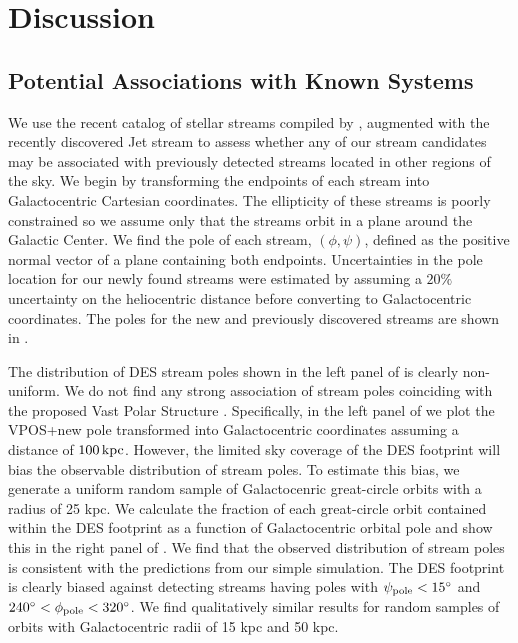\documentclass[twocolumn]{aastex61}
\begin{document}
\section{Discussion}
\label{sec:discussion}

\subsection{Potential Associations with Known Systems}
\label{sec:assocs}
We use the recent catalog of stellar streams compiled by \citet{Mateu:2017}, augmented with the recently discovered Jet stream \citep{Jethwa:2017} to assess whether any of our stream candidates may be associated with previously detected streams located in other regions of the sky. 
We begin by transforming the endpoints of each stream into Galactocentric Cartesian coordinates. 
The ellipticity of these streams is poorly constrained so we assume only that the streams orbit in a plane around the Galactic Center. 
We find the pole of each stream, $(\phi,\psi)$, defined as the positive normal vector of a plane containing both endpoints.
Uncertainties in the pole location for our newly found streams were estimated by assuming a $20\%$ uncertainty on the heliocentric distance before converting to Galactocentric coordinates. 
The poles for the new and previously discovered streams are shown in .

The distribution of DES stream poles shown in the left panel of  is clearly non-uniform.
We do not find any strong association of stream poles coinciding with the proposed Vast Polar Structure \citep[VPOS;][]{Pawlowski:2012,Pawlowski:2015}.
Specifically, in the left panel of  we plot the VPOS+new pole  \citep[Table 1 of ][]{Pawlowski:2015} transformed into Galactocentric coordinates assuming a distance of $100\mathrm{\,kpc}$.
However, the limited sky coverage of the DES footprint will bias the observable distribution of stream poles.
To estimate this bias, we generate a uniform random sample of Galactocenric great-circle orbits with a radius of 25 kpc. 
We calculate the fraction of each great-circle orbit contained within the DES footprint as a function of Galactocentric orbital pole and show this in the right panel of .  
We find that the observed distribution of stream poles is consistent with the predictions from our simple simulation.
The DES footprint is clearly biased against detecting streams having poles with $\psi_{\rm pole} < 15{}^{\circ}$ and $240{}^{\circ} < \phi_{\rm pole} < 320{}^{\circ}$.
We find qualitatively similar results for random samples of orbits with Galactocentric radii of 15 kpc and 50 kpc.
\end{document}

